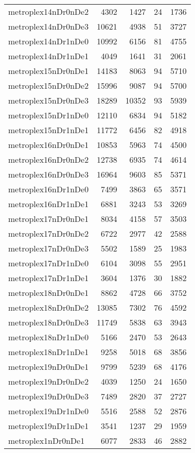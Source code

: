 \begin{longtable}{lrrrr}
metroplex14nDr0nDe2 & 4302 & 1427 & 24 & 1736 \\
metroplex14nDr0nDe3 & 10621 & 4938 & 51 & 3727 \\
metroplex14nDr1nDe0 & 10992 & 6156 & 81 & 4755 \\
metroplex14nDr1nDe1 & 4049 & 1641 & 31 & 2061 \\
metroplex15nDr0nDe1 & 14183 & 8063 & 94 & 5710 \\
metroplex15nDr0nDe2 & 15996 & 9087 & 94 & 5700 \\
metroplex15nDr0nDe3 & 18289 & 10352 & 93 & 5939 \\
metroplex15nDr1nDe0 & 12110 & 6834 & 94 & 5182 \\
metroplex15nDr1nDe1 & 11772 & 6456 & 82 & 4918 \\
metroplex16nDr0nDe1 & 10853 & 5963 & 74 & 4500 \\
metroplex16nDr0nDe2 & 12738 & 6935 & 74 & 4614 \\
metroplex16nDr0nDe3 & 16964 & 9603 & 85 & 5371 \\
metroplex16nDr1nDe0 & 7499 & 3863 & 65 & 3571 \\
metroplex16nDr1nDe1 & 6881 & 3243 & 53 & 3269 \\
metroplex17nDr0nDe1 & 8034 & 4158 & 57 & 3503 \\
metroplex17nDr0nDe2 & 6722 & 2977 & 42 & 2588 \\
metroplex17nDr0nDe3 & 5502 & 1589 & 25 & 1983 \\
metroplex17nDr1nDe0 & 6104 & 3098 & 55 & 2951 \\
metroplex17nDr1nDe1 & 3604 & 1376 & 30 & 1882 \\
metroplex18nDr0nDe1 & 8862 & 4728 & 66 & 3752 \\
metroplex18nDr0nDe2 & 13085 & 7302 & 76 & 4592 \\
metroplex18nDr0nDe3 & 11749 & 5838 & 63 & 3943 \\
metroplex18nDr1nDe0 & 5166 & 2470 & 53 & 2643 \\
metroplex18nDr1nDe1 & 9258 & 5018 & 68 & 3856 \\
metroplex19nDr0nDe1 & 9799 & 5239 & 68 & 4176 \\
metroplex19nDr0nDe2 & 4039 & 1250 & 24 & 1650 \\
metroplex19nDr0nDe3 & 7489 & 2820 & 37 & 2727 \\
metroplex19nDr1nDe0 & 5516 & 2588 & 52 & 2876 \\
metroplex19nDr1nDe1 & 3541 & 1237 & 29 & 1959 \\
metroplex1nDr0nDe1 & 6077 & 2833 & 46 & 2882 \\

\end{longtable}
